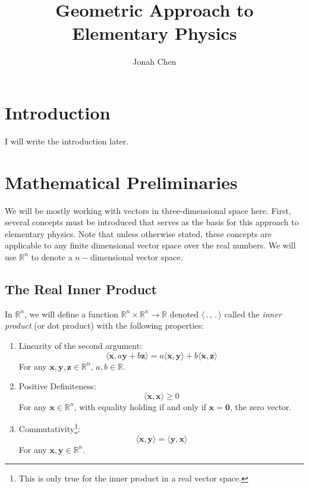 \documentclass{article}
\title{Geometric Approach to Elementary Physics}
\author{Jonah Chen}
\numberwithin{equation}{section}
\newcommand{\R}{\mathbb{R}}
\newcommand{\ve}{\mathbf}
\begin{document}
    \maketitle
    \tableofcontents

\section{Introduction}

I will write the introduction later. 

\section{Mathematical Preliminaries}

We will be mostly working with vectors in three-dimensional space here. First, several concepts must be introduced that serves as the basis for this approach to elementary physics. Note that unless otherwise stated, these concepts are applicable to any finite dimensional vector space over the real numbers. We will use $\R^n$ to denote a $n-$dimensional vector space.

\subsection{The Real Inner Product}

\begin{definition}
    In $\R^n$, we will define a function $\R^n\times\R^n\to\R$ denoted $\langle\, .\, ,\, .\, \rangle$ called the \textit{inner product} (or dot product) with the following properties:
    \begin{enumerate}
        \item Linearity of the second argument:
        \begin{equation}
            \langle \ve x,a\ve y+b\ve z\rangle=a\langle \ve x,\ve y\rangle+b\langle \ve x,\ve z\rangle
        \end{equation}
        For any $\ve x,\ve y, \ve z\in\R^n,\, a,b\in \R$.
        \item Positive Definiteness:
        \begin{equation}
            \langle \ve x,\ve x\rangle \geq 0
        \end{equation}
        For any $\ve x\in\R^n$, with equality holding if and only if $\ve x=\ve 0$, the zero vector.
        \item Commutativity\footnote{This is only true for the inner product in a real vector space.}:
        \begin{equation}
            \langle \ve x, \ve y\rangle =\langle \ve y,\ve x\rangle
        \end{equation}
        For any $\ve x,\ve y\in\R^n$.
    \end{enumerate}
\end{definition}
\end{document}
